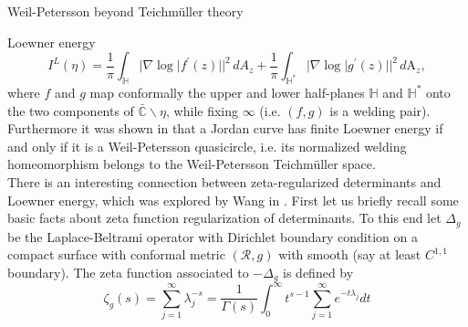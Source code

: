 \documentclass[12pt]{amsart}
\newcommand{\sphere}{\bar{\Bbb{C}}} %
\renewcommand{\Bbb}[1]{\ensuremath{\mathbb{#1}}}
\theoremstyle{plain}
\theoremstyle{definition}
\theoremstyle{remark}
\numberwithin{equation}{section} %
\numberwithin{figure}{section} %
\begin{document}
\begin{section}{Weil-Petersson beyond Teichm\"uller theory}
\begin{subsection}{Loewner energy}
\begin{equation}
I^{L}(\eta)=\frac{1}{\pi} \int_{\mathbb{H}}|\nabla \log | f^{\prime}(z)||^{2}\, d A_z+\frac{1}{\pi} \int_{\mathbb{H}^{*}}|\nabla \log | g^{\prime}(z)||^{2}\, d\mathrm{A}_z,
\end{equation}
where \(f\) and \(g\) map conformally the upper and lower half-planes $\mathbb{H}$ and $\mathbb{H}^{*}$ onto the two components of \(\sphere \backslash \eta\), while fixing \(\infty\) (i.e. $(f,g)$ is a welding pair). Furthermore it was  shown in \cite{Wang} that a Jordan curve has finite Loewner energy if and only if it is
a Weil-Petersson quasicircle, i.e. its normalized welding homeomorphism belongs to the
Weil-Petersson Teichmüller space.\\
There is an interesting connection between zeta-regularized determinants and Loewner energy, which was explored by Wang in \cite{wangzeta}. First let us briefly recall some basic facts about zeta function regularization of determinants.
To this end let \(\Delta_g\) be the Laplace-Beltrami operator with Dirichlet boundary
condition on a compact surface with conformal metric \((\mathscr{R}, g)\) with smooth (say at least \(C^{1,1}\)  boundary).
The zeta function associated to $-\Delta_g$ is defined by
\begin{equation}
    \zeta_{g}(s)=\sum_{j=1}^{\infty} \lambda_{j}^{-s}=\frac{1}{\Gamma(s)} \int_{0}^{\infty} t^{s-1} \sum_{j=1}^{\infty} e^{-t \lambda_{j}} d t
\end{equation}


\end{subsection}
\end{section}
\end{document}
